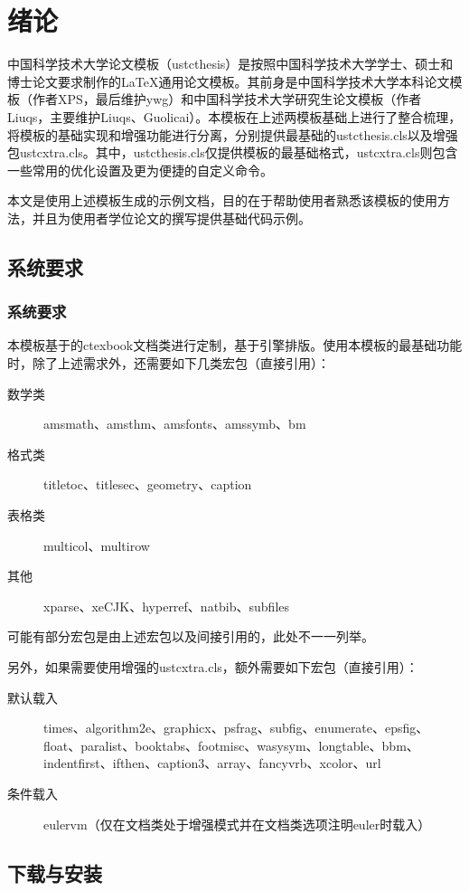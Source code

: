 ﻿
\chapter{绪论}
\label{chap:introduction}

中国科学技术大学论文模板（ustcthesis）是按照中国科学技术大学学士、硕士和博士论文要求制作的\LaTeX 通用论文模板。其前身是中国科学技术大学本科论文模板（作者XPS，最后维护ywg）和中国科学技术大学研究生论文模板（作者Liuqs，主要维护Liuqs、Guolicai）。本模板在上述两模板基础上进行了整合梳理，将模板的基础实现和增强功能进行分离，分别提供最基础的ustcthesis.cls以及增强包ustcxtra.cls。其中，ustcthesis.cls仅提供模板的最基础格式，ustcxtra.cls则包含一些常用的优化设置及更为便捷的自定义命令。

本文是使用上述模板生成的示例文档，目的在于帮助使用者熟悉该模板的使用方法，并且为使用者学位论文的撰写提供基础代码示例。

\section{系统要求}
\subsection{系统要求}
本模板基于\CTeX 的ctexbook文档类进行定制，基于\XeTeX 引擎排版。使用本模板的最基础功能时，除了上述需求外，还需要如下几类宏包（直接引用）：
\begin{description}
\item[数学类]{amsmath、amsthm、amsfonts、amssymb、bm}
\item[格式类]{titletoc、titlesec、geometry、caption}
\item[表格类]{multicol、multirow}
\item[其他]{xparse、xeCJK、hyperref、natbib、subfiles}
\end{description}
可能有部分宏包是由上述宏包以及\CTeX 间接引用的，此处不一一列举。

另外，如果需要使用增强的ustcxtra.cls，额外需要如下宏包（直接引用）：
\begin{description}
\item[默认载入]{times、algorithm2e、graphicx、psfrag、subfig、enumerate、epsfig、float、paralist、booktabs、footmisc、wasysym、longtable、bbm、indentfirst、ifthen、caption3、array、fancyvrb、xcolor、url}
\item[条件载入]{eulervm（仅在文档类处于增强模式并在文档类选项注明euler时载入）}
\end{description}

\section{下载与安装}

